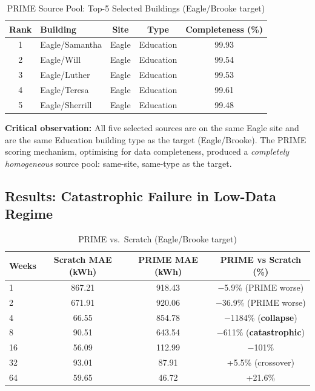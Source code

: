 \documentclass[12pt,a4paper]{report}
\begin{document}
\begin{table}[H]
\centering
\caption{PRIME Source Pool: Top-5 Selected Buildings (Eagle/Brooke target)}
\small
\begin{tabular}{clccc}
\toprule
\textbf{Rank} & \textbf{Building} & \textbf{Site} & \textbf{Type} & \textbf{Completeness (\%)} \\
\midrule
1 & Eagle/Samantha & Eagle & Education & 99.93 \\
2 & Eagle/Will & Eagle & Education & 99.54 \\
3 & Eagle/Luther & Eagle & Education & 99.53 \\
4 & Eagle/Teresa & Eagle & Education & 99.61 \\
5 & Eagle/Sherrill & Eagle & Education & 99.48 \\
\bottomrule
\end{tabular}
\end{table}

\textbf{Critical observation:} All five selected sources are on the same Eagle site and are the same Education building type as the target (Eagle/Brooke). The PRIME scoring mechanism, optimising for data completeness, produced a \textit{completely homogeneous} source pool: same-site, same-type as the target.

\subsection{Results: Catastrophic Failure in Low-Data Regime}

\begin{table}[H]
\centering
\caption{PRIME vs.\ Scratch (Eagle/Brooke target)}
\small
\begin{tabular}{lccc}
\toprule
\textbf{Weeks} & \textbf{Scratch MAE (kWh)} & \textbf{PRIME MAE (kWh)} & \textbf{PRIME vs Scratch (\%)} \\
\midrule
1 & 867.21 & 918.43 & $-$5.9\% (PRIME worse) \\
2 & 671.91 & 920.06 & $-$36.9\% (PRIME worse) \\
4 & 66.55 & 854.78 & $-$1184\% (\textbf{collapse}) \\
8 & 90.51 & 643.54 & $-$611\% (\textbf{catastrophic}) \\
16 & 56.09 & 112.99 & $-$101\% \\
32 & 93.01 & 87.91 & +5.5\% (crossover) \\
64 & 59.65 & 46.72 & +21.6\% \\
\bottomrule
\end{tabular}
\end{table}
\end{document}
